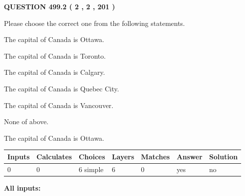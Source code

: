 \documentclass[12pt]{article}
\begin{document}
   
  
\vspace{0.2in}
  
{\textbf{\Large{QUESTION
499.2 
 ( 2 , 2 , 201 )
}}}
  
  
Please choose the correct one from the following statements.
 
 
The capital of Canada is Ottawa.
 
 
The capital of Canada is Toronto.
 
 
The capital of Canada is Calgary.
 
 
The capital of Canada is Quebec City.
 
 
The capital of Canada is Vancouver.
 
 
 None of above.
 
 
\noindent{}
 
 
The capital of Canada is Ottawa.
 
 
\noindent{}
 
 
   
   
   
   
\noindent\begin{tabular}{|l|l|l|l|l|l|l|}
 \hline
Inputs & Calculates & Choices & Layers & Matches & Answer & Solution \\ \hline
 0  & 
 0  & 
 6
  simple  
  & 
 6  & 
 0  & 
  yes & 
  no 
  \\ \hline
 \end{tabular}
   
   
   
   
\noindent{}
   
   
   
   
\noindent\vspace{0.1in}\hspace{-0.08in} {\textbf{\Large{All inputs: }}}
   
   
   
   
   
   
 \vspace{0.2in}
 
   
   
\end{document}
